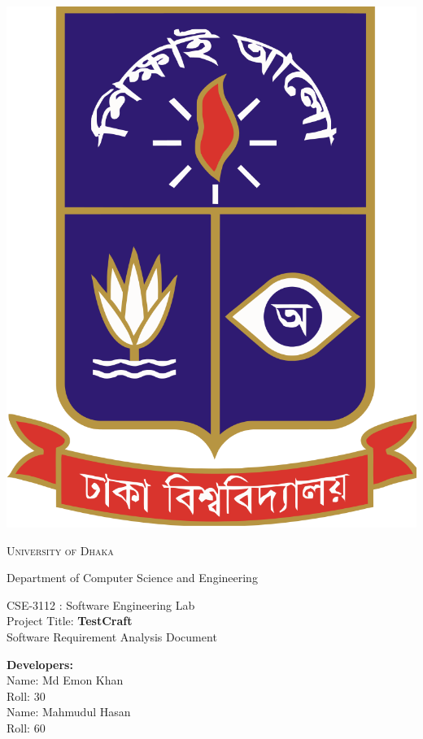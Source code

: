 \documentclass[11pt]{article}
\newcommand{\projectTitle}{\textbf{TestCraft}} %
\begin{document}
\begin{titlepage}
    \begin{center}
        \includegraphics[scale=0.10]{du.png}\par
        \begin{Huge}
            \textsc{University of Dhaka}\par
        \end{Huge}
        \begin{Large}
            Department of Computer Science and Engineering\par
            \vspace{1cm}
            CSE-3112 : Software Engineering Lab \\[12pt]
            Project Title: \projectTitle \\[12pt]
            Software Requirement Analysis Document
        \end{Large}
    \end{center}
    \vfill
    \begin{Large}
        \textbf{Developers:\\[12pt]}
        Name: Md Emon Khan \\[8pt]
        Roll: 30 \\[12pt]
        Name: Mahmudul Hasan \\[8pt]
        Roll: 60 \\[12pt]
    \end{Large}
\end{titlepage}
\newpage
\end{document}

